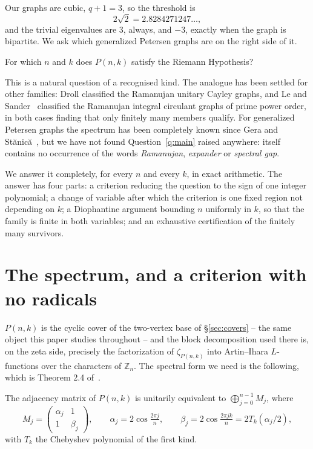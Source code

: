 Our graphs are cubic, $q+1=3$, so the threshold is
\[
  2\sqrt2 = 2.8284271247\ldots,
\]
and the trivial eigenvalues are $3$, always, and $-3$, exactly when the graph is
bipartite. We ask which generalized Petersen graphs are on the right side of it.

\begin{question}\label{q:main}
For which $n$ and $k$ does $P(n,k)$ satisfy the Riemann Hypothesis?
\end{question}

This is a natural question of a recognised kind. The analogue has been settled
for other families: Droll classified the Ramanujan unitary Cayley graphs, and
Le and Sander~\cite{lesander} classified the Ramanujan integral circulant
graphs of prime power order, in both cases finding that only finitely many
members qualify. For generalized Petersen graphs the spectrum has been
completely known since Gera and St\u{a}nic\u{a}~\cite{gs}, but we have not found
Question~\ref{q:main} raised anywhere: \cite{gs} itself contains no occurrence
of the words \emph{Ramanujan}, \emph{expander} or \emph{spectral gap}.

We answer it completely, for every $n$ and every $k$, in exact arithmetic. The
answer has four parts: a criterion reducing the question to the sign of one
integer polynomial; a change of variable after which the criterion is one fixed
region not depending on $k$; a Diophantine argument bounding $n$ uniformly in
$k$, so that the family is finite in both variables; and an exhaustive
certification of the finitely many survivors.

\section{The spectrum, and a criterion with no radicals}\label{sec:crit}

$P(n,k)$ is the cyclic cover of the two-vertex base of \S\ref{sec:covers} --
the same object this paper studies throughout -- and the block decomposition
used there is, on the zeta side, precisely the factorization of $\zeta_{P(n,k)}$
into Artin--Ihara $L$-functions over the characters of $\mathbb Z_n$. The
spectral form we need is the following, which is Theorem 2.4 of~\cite{gs}.

\begin{lemma}\label{lem:blocks}
The adjacency matrix of $P(n,k)$ is unitarily equivalent to
$\bigoplus_{j=0}^{n-1}M_j$, where
\[
  M_j=\begin{pmatrix}\alpha_j&1\\1&\beta_j\end{pmatrix},\qquad
  \alpha_j=2\cos\tfrac{2\pi j}{n},\qquad
  \beta_j=2\cos\tfrac{2\pi jk}{n}=2T_k(\alpha_j/2),
\]
with $T_k$ the Chebyshev polynomial of the first kind.
\end{lemma}


